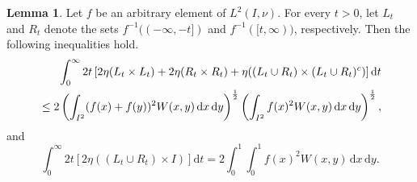 \documentclass[12pt,a4paper,bold]{thesis}
\theoremstyle{definition}
\newtheorem{lemma}[thm]{Lemma}
\begin{document}
\begin{lemma} \label{lemma:main}
    Let $f$ be an arbitrary element of $L^2(I, \nu)$. For every $t > 0$, let $L_t$
    and $R_t$ denote the sets $f^{-1}((-\infty, -t])$ and $f^{-1}([t, \infty))$,
    respectively. Then the following inequalities hold.
    \begin{align} \label{ineq:int-num}
        & \hspace{0.6cm}
        \int_{0}^{\infty} 2t \left[2 \eta(L_t \times L_t) + 2 \eta(R_t \times R_t)
        + \eta((L_t \cup R_t) \times (L_t \cup R_t)^c)\right] \mathrm{d}t \nonumber
        \\
        & \leq
        2 \left(\int_{I^2} (f(x) + f(y))^2 W(x,y)\, \mathrm{d}x\, \mathrm{d}y
        \right)^\frac{1}{2} \left(\int_{I^2} f(x)^2 W(x,y)\, 
        \mathrm{d}x\, \mathrm{d}y\right)^\frac{1}{2},
    \end{align}
    and
    \begin{equation} \label{eq:int-den}
        \int_{0}^{\infty} 2t \left[2 \eta((L_t \cup R_t) \times I)\right] \mathrm{d}t
        = 2 \int_{0}^{1} \int_{0}^{1} f(x)^2 W(x,y)\, \mathrm{d}x\, \mathrm{d}y.
    \end{equation}
\end{lemma}
\end{document}
